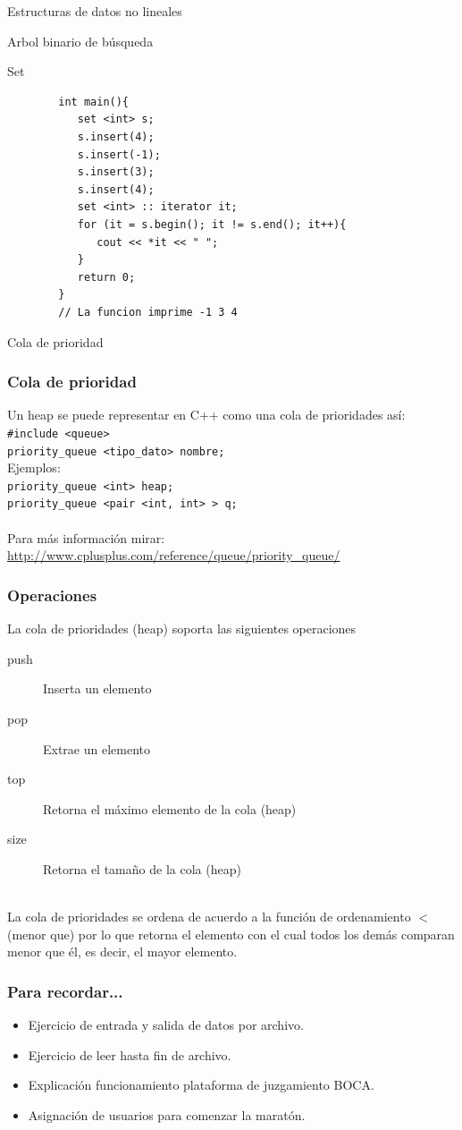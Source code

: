 \documentclass{beamer}
\begin{document}
\begin{section}{Estructuras de datos no lineales}
\begin{subsection}{Arbol binario de búsqueda}
\begin{subsubsection}{Set}
\begin{frame}[fragile]
\begin{lstlisting}
		int main(){
		   set <int> s;
		   s.insert(4); 
		   s.insert(-1);
		   s.insert(3);
		   s.insert(4);
		   set <int> :: iterator it;
		   for (it = s.begin(); it != s.end(); it++){
		      cout << *it << " ";
		   }
		   return 0;
		}
		// La funcion imprime -1 3 4
		\end{lstlisting}
	\end{frame}
\end{subsubsection}


\begin{subsubsection}{Cola de prioridad}
	\begin{frame}[fragile]
		\frametitle{Cola de prioridad}
		Un heap se puede representar en C++ como una cola de prioridades así:
		\verb|#include <queue>|\\
		\verb|priority_queue <tipo_dato> nombre;|\\
		Ejemplos:\\
		\verb|priority_queue <int> heap;|\\
		\verb|priority_queue <pair <int, int> > q;|\\
		\quad \\
		Para más información mirar: \url{http://www.cplusplus.com/reference/queue/priority_queue/}
	\end{frame}
	
	
	\begin{frame}
		\frametitle{Operaciones}
		La cola de prioridades (heap) soporta las siguientes operaciones
		\begin{description}
			\item [push] Inserta un elemento
			\item [pop] Extrae un elemento
			\item [top] Retorna el máximo elemento de la cola (heap)
			\item [size] Retorna el tamaño de la cola (heap)
		\end{description}
		\quad \\
		La cola de prioridades se ordena de acuerdo a la función de ordenamiento $<$ (menor que) por lo que retorna el elemento con el cual todos los demás comparan menor que él, es decir, el mayor elemento.
	\end{frame}

	\begin{frame}[fragile]
		\frametitle{Para recordar...}
		\begin{itemize}
			\item Ejercicio de entrada y salida de datos por archivo.
			\pause
			\item Ejercicio de leer hasta fin de archivo.
			\pause
			\item Explicación funcionamiento plataforma de juzgamiento BOCA.
			\pause
			\item Asignación de usuarios para comenzar la maratón.
		\end{itemize}
	\end{frame}


\end{subsubsection}
\end{subsection}
\end{section}
\end{document}

